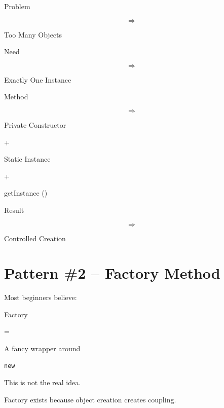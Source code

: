 \documentclass[11pt,a4paper]{book}
\begin{document}
\begin{compressionbox}

Problem

\[
\Rightarrow
\]

Too Many Objects

\vspace{0.5em}

Need

\[
\Rightarrow
\]

Exactly One Instance

\vspace{0.5em}

Method

\[
\Rightarrow
\]

Private Constructor

+

Static Instance

+

getInstance ()

\vspace{0.5em}

Result

\[
\Rightarrow
\]

Controlled Creation

\end{compressionbox}
\section{Pattern \#2 -- Factory Method}

Most beginners believe:


Factory

=

A fancy wrapper around

\begin{verbatim}
new
\end{verbatim}


This is not the real idea.


Factory exists because object
creation creates coupling.

\end{document}
